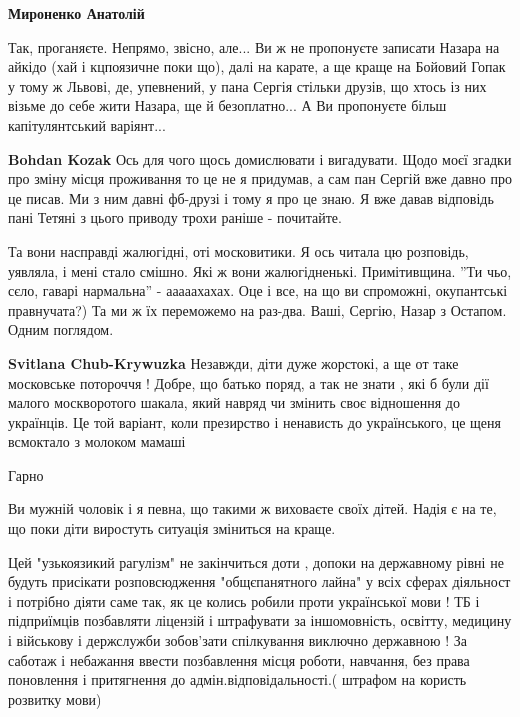 \begin{itemize}
\begin{itemize}
\textbf{Мироненко Анатолій}

Так, проганяєте. Непрямо, звісно, але... Ви ж не пропонуєте записати Назара на
айкідо (хай і кцпоязичне поки що), далі на карате, а ще краще на Бойовий Гопак
у тому ж Львові, де, упевнений, у пана Сергія стільки друзів, що хтось із них
візьме до себе жити Назара, ще й безоплатно... А Ви пропонуєте більш
капітулянтський варіянт...

\textbf{Bohdan Kozak} Ось для чого щось домислювати і вигадувати. Щодо моєї згадки про зміну місця проживання то це не я придумав, а сам пан Сергій вже давно про це писав. Ми з ним давні фб-друзі і тому я про це знаю. Я вже давав відповідь пані Тетяні з цього приводу трохи раніше - почитайте.

\end{itemize} %


Та вони насправді жалюгідні, оті московитики.  Я ось читала цю розповідь,
уявляла, і мені стало смішно.  Які ж вони жалюгідненькі. Примітивщина. ''Ти
чьо, сєло, гаварі нармальна'' - ааааахахах. Оце і все, на що ви спроможні,
окупантські правнучата?) Та ми ж їх переможемо на раз-два. Ваші, Сергію, Назар
з Остапом. Одним поглядом.

\begin{itemize} %
\textbf{Svitlana Chub-Krywuzka} Незавжди, діти дуже жорстокі, а ще от таке московське потороччя !
Добре, що батько поряд, а так не знати , які б були дії малого москворотого шакала, який навряд чи змінить своє відношення до українців.
Це той варіант, коли презирство і ненависть до українського, це щеня всмоктало з молоком мамаші
\end{itemize} %

Гарно

Ви мужній чоловік і я певна, що такими ж виховаєте своїх дітей. Надія є на те, що поки діти виростуть ситуація зміниться на краще.


Цей "узькоязикий рагулізм" не закінчиться доти , допоки на державному рівні не
будуть присікати розповсюдження "общєпанятного лайна" у всіх сферах діяльност і
потрібно діяти саме так, як це колись робили проти української мови ! ТБ і
підприїмців позбавляти ліцензій і штрафувати за іншомовність, освітту, медицину
і військову і держслужби зобов'зати спілкування виключно державною ! За саботаж
і небажання ввести позбавлення місця роботи, навчання, без права поновлення і
притягнення до адмін.відповідальності.( штрафом на користь розвитку мови)



\end{itemize}
